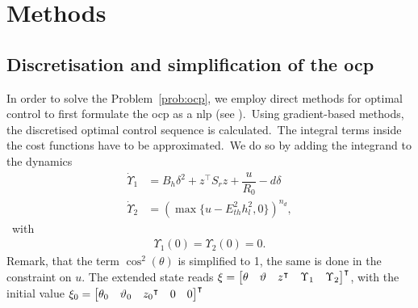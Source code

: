 \section{Methods}

\subsection{Discretisation and simplification of the \ac{ocp}}
In order to solve the Problem~\ref{prob:ocp}, we employ direct methods for optimal control to first formulate the \ac{ocp} as a \ac{nlp} (see \cite{Gerdts2011OC}).\ 
Using gradient-based methods, the discretised optimal control sequence is calculated.\ 
The integral terms inside the cost functions have to be approximated.\ 
We do so by adding the integrand to the dynamics
\begin{align*}
	\dot{\Upsilon}_1 &= B_h\delta^2 +z^\intercal S_r z +\dfrac{u}{R_0} - d \delta \nonumber\\
	\dot{\Upsilon}_2 &= \left(\max \{ u-E_{th}^2 h_l^2,0 \} \right)^{n_d},
\end{align*}\ 
with
\begin{align*}
	\Upsilon_1(0) = \Upsilon_2(0) = 0.
\end{align*}
Remark, that the term $\cos^2(\theta)$ is simplified to 1, the same is done in the constraint on $u$.
The extended state reads
$\xi = \begin{bmatrix}
	{\theta} &
	{\vartheta} & 
	{z{^\intercal}} &
	{\Upsilon_1} &
	{\Upsilon_2}
\end{bmatrix}^\intercal$, with the initial value $\xi_0 = \begin{bmatrix}
{\theta_0} &
{\vartheta_0} & 
{z_0{^\intercal}} &
{0} &
{0}
\end{bmatrix}^\intercal$

